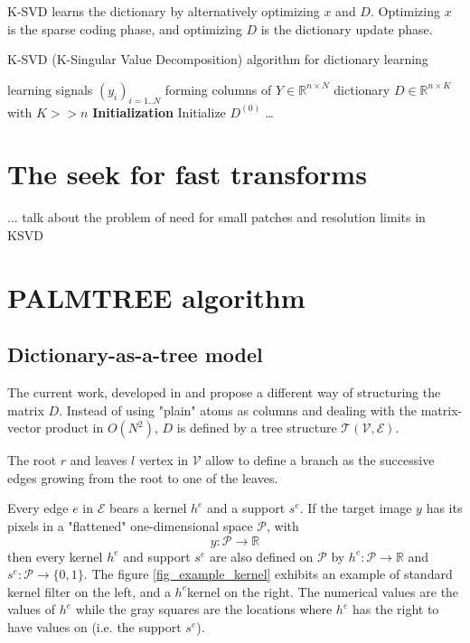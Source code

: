 K-SVD learns the dictionary by alternatively optimizing $x$ and $D$. Optimizing $x$ is the sparse coding phase, and optimizing $D$ is the dictionary update phase.


\begin{algorithm} %
    \caption{K-SVD (K-Singular Value Decomposition) algorithm for dictionary learning}
  \begin{algorithmic}[0]
    \Input learning signals $(y_i)_{i=1..N}$ forming columns of $Y \in \mathbb{R}^{n \times N}$
    \Output dictionary $D \in \mathbb{R}^{n \times K}$ with $K>>n$
    \State \textbf{Initialization} Initialize $D^{(0)}$
	\State \dots
    \EndWhile
  \end{algorithmic}
\end{algorithm}
\section{The seek for fast transforms}
... talk about the problem of need for small patches and resolution limits in KSVD %

\section{PALMTREE algorithm}

\subsection{Dictionary-as-a-tree model \label{sec_tree_model}}
The current work, developed in \cite{chabiron_toward_2015} and \cite{chabiron_optimization_2016} propose a different way of structuring the matrix $D$. Instead of using "plain" atoms as columns and dealing with the matrix-vector product in $O(N^2)$, $D$ is defined by a tree structure $\mathcal{T}(\mathcal{V},\mathcal{E})$. 

The root $r$ and leaves $l$ vertex in $\mathcal{V}$ allow to define a branch as the successive edges growing from the root to one of the leaves.

Every edge $e$ in $\mathcal{E}$ bears a kernel $h^e$ and a support $s^e$. If the target image $y$ has its pixels in a "flattened" one-dimensional space $\mathcal{P}$, with
$$y : \mathcal{P} \rightarrow \mathbb{R}$$
then every kernel $h^e$ and support $s^e$ are also defined on $\mathcal{P}$ by $h^e:\mathcal{P} \rightarrow \mathbb{R}$ and $s^e:\mathcal{P} \rightarrow \{0,1\}$. The figure \ref{fig_example_kernel} exhibits an example of standard kernel filter on the left, and a $h^e$kernel on the right. The numerical values are the values of $h^e$ while the gray squares are the locations where $h^e$ has the right to have values on (i.e. the support $s^e$).

